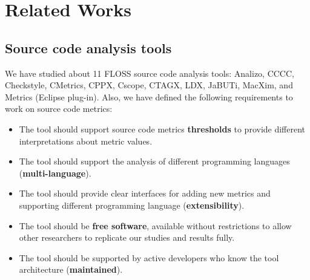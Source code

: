 \section{Related Works}
\label{sec:related_works}


\subsection{Source code analysis tools}
\label{subsec:related-tools}

We have studied about 11 FLOSS source code analysis tools:
%
Analizo,
CCCC,
Checkstyle,
CMetrics,
CPPX,
Cscope,
CTAGX,
LDX,
JaBUTi,
MacXim,
and Metrics (Eclipse plug-in).
%
Also, we have defined the following requirements to work on source
code metrics:

\begin{itemize}

  \item The tool should support source code metrics \textbf{thresholds} to
provide different interpretations about metric values.

  \item The tool should support the analysis of different programming languages
(\textbf{multi-language}).

  \item The tool should provide clear interfaces for adding new metrics and supporting
different programming language (\textbf{extensibility}).

  \item The tool should be \textbf{free software}, available without
restrictions to allow other researchers to replicate our studies and results
fully.

  \item The tool should be supported by active developers who know the tool
architecture (\textbf{maintained}).
 
\end{itemize}


